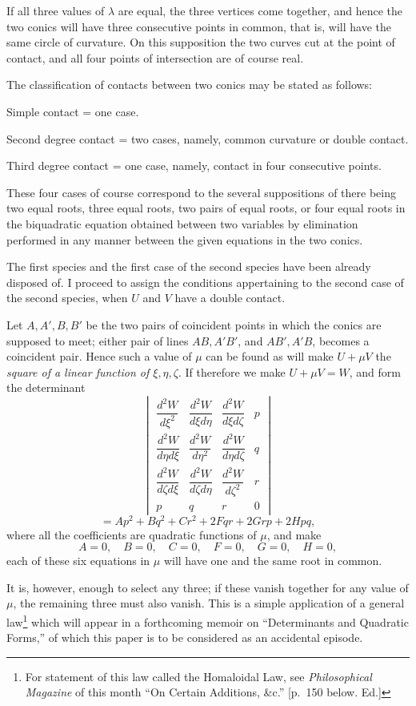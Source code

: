 \documentclass[11pt]{article}
\newcommand{\sourcepage}[1]{\marginpar{\scriptsize p.~#1}}
\begin{document}
{{If all three values of $\lambda$ are equal, the three vertices come together, and hence the two conics will have three consecutive points in common, that is, will have the same circle of curvature. On this supposition the two curves cut at the point of contact, and all four points of intersection are of course real.

\sourcepage{129}
The classification of contacts between two conics may be stated as follows:

Simple contact = one case.

Second degree contact = two cases, namely, common curvature or double contact.

Third degree contact = one case, namely, contact in four consecutive points.

These four cases of course correspond to the several suppositions of there being two equal roots, three equal roots, two pairs of equal roots, or four equal roots in the biquadratic equation obtained between two variables by elimination performed in any manner between the given equations in the two conics.

The first species and the first case of the second species have been already disposed of. I proceed to assign the conditions appertaining to the second case of the second species, when $U$ and $V$ have a double contact.

Let $A,A',B,B'$ be the two pairs of coincident points in which the conics are supposed to meet; either pair of lines $AB,A'B'$, and $AB',A'B$, becomes a coincident pair. Hence such a value of $\mu$ can be found as will make $U+\mu V$ the \emph{square of a linear function of $\xi,\eta,\zeta$}. If therefore we make $U+\mu V=W$, and form the determinant
\[
\begin{vmatrix}
\dfrac{d^2W}{d\xi^2}&\dfrac{d^2W}{d\xi d\eta}&\dfrac{d^2W}{d\xi d\zeta}&p\\[0.7em]
\dfrac{d^2W}{d\eta d\xi}&\dfrac{d^2W}{d\eta^2}&\dfrac{d^2W}{d\eta d\zeta}&q\\[0.7em]
\dfrac{d^2W}{d\zeta d\xi}&\dfrac{d^2W}{d\zeta d\eta}&\dfrac{d^2W}{d\zeta^2}&r\\[0.7em]
p&q&r&0
\end{vmatrix}
\]
\[
=Ap^2+Bq^2+Cr^2+2Fqr+2Grp+2Hpq,
\]
where all the coefficients are quadratic functions of $\mu$, and make
\[
A=0,\quad B=0,\quad C=0,\quad F=0,\quad G=0,\quad H=0,
\]
each of these six equations in $\mu$ will have one and the same root in common.

It is, however, enough to select any three; if these vanish together for any value of $\mu$, the remaining three must also vanish. This is a simple application of a general law\footnote{For statement of this law called the Homaloidal Law, see \emph{Philosophical Magazine} of this month ``On Certain Additions, \&c.'' [p.~150 below. Ed.]} which will appear in a forthcoming memoir on ``Determinants and Quadratic Forms,'' of which this paper is to be considered as an accidental episode.

}}
\end{document}
